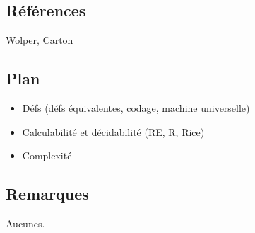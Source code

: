 \documentclass[../../agregation.tex]{subfiles}
\begin{document}

\dvts

\subsection{Références}

Wolper, Carton

\subsection{Plan}

\begin{itemize}
	\item Défs (défs équivalentes, codage, machine universelle)
	\item Calculabilité et décidabilité (RE, R, Rice)
	\item Complexité
\end{itemize}

\subsection{Remarques}

Aucunes.
\end{document}
